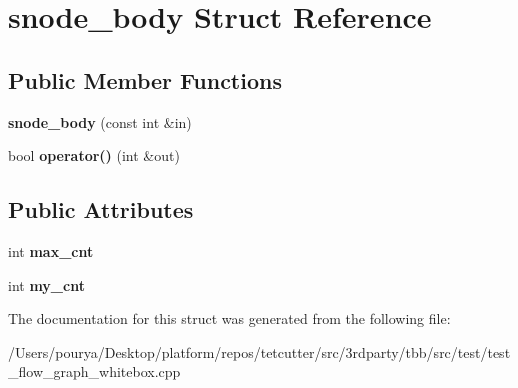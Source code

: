\hypertarget{structsnode__body}{}\section{snode\+\_\+body Struct Reference}
\label{structsnode__body}
\subsection*{Public Member Functions}
\begin{DoxyCompactItemize}
\item 
\hypertarget{structsnode__body_a8ea70b6694e7fea861f424089cfece59}{}{\bfseries snode\+\_\+body} (const int \&in)\label{structsnode__body_a8ea70b6694e7fea861f424089cfece59}

\item 
\hypertarget{structsnode__body_af744666369638c0e9c574437fbeee8e5}{}bool {\bfseries operator()} (int \&out)\label{structsnode__body_af744666369638c0e9c574437fbeee8e5}

\end{DoxyCompactItemize}
\subsection*{Public Attributes}
\begin{DoxyCompactItemize}
\item 
\hypertarget{structsnode__body_ab578ec883c82584d61c6c1f049684777}{}int {\bfseries max\+\_\+cnt}\label{structsnode__body_ab578ec883c82584d61c6c1f049684777}

\item 
\hypertarget{structsnode__body_ae9ee845e7fd6f2eef4e2ba7b0e12249a}{}int {\bfseries my\+\_\+cnt}\label{structsnode__body_ae9ee845e7fd6f2eef4e2ba7b0e12249a}

\end{DoxyCompactItemize}


The documentation for this struct was generated from the following file\+:\begin{DoxyCompactItemize}
\item 
/\+Users/pourya/\+Desktop/platform/repos/tetcutter/src/3rdparty/tbb/src/test/test\+\_\+flow\+\_\+graph\+\_\+whitebox.\+cpp\end{DoxyCompactItemize}
